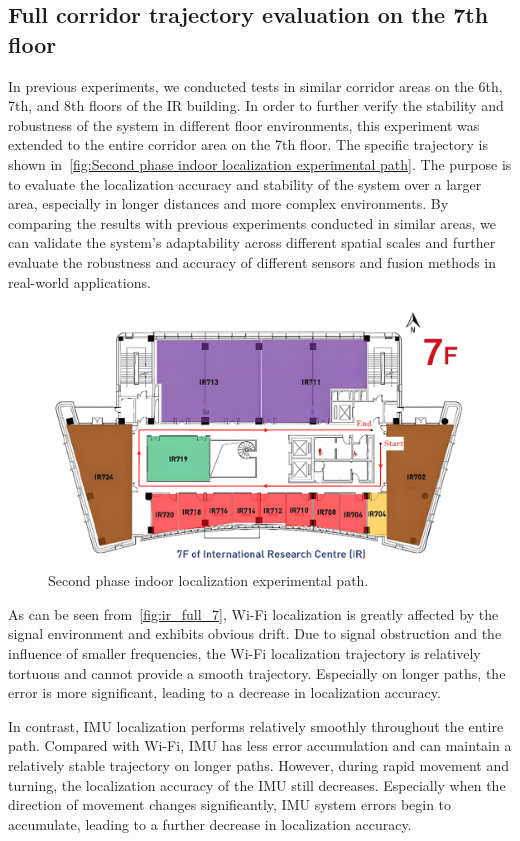 \documentclass[12pt,a4paper]{article}
\numberwithin{equation}{section}
\begin{document}
\subsection{Full corridor trajectory evaluation on the 7th floor}
In previous experiments, we conducted tests in similar corridor areas on the
6th, 7th, and 8th floors of the IR building. In order to further verify the
stability and robustness of the system in different floor environments, this
experiment was extended to the entire corridor area on the 7th floor. The
specific trajectory is shown in~\autoref{fig:Second phase indoor localization
  experimental path}. The purpose is to evaluate the localization accuracy and
stability of the system over a larger area, especially in longer distances and
more complex environments. By comparing the results with previous experiments
conducted in similar areas, we can validate the system's adaptability across
different spatial scales and further evaluate the robustness and accuracy of
different sensors and fusion methods in real-world applications.
\begin{figure}[H]
  \centering
  \includegraphics[width=0.9\linewidth]{images/ir_full_circle.png}
  \caption{Second phase indoor localization experimental path.}
  \label{fig:Second phase indoor localization experimental path}
\end{figure}

As can be seen from~\autoref{fig:ir_full_7}, Wi-Fi localization is greatly
affected by the signal environment and exhibits obvious drift. Due to signal
obstruction and the influence of smaller frequencies, the Wi-Fi localization
trajectory is relatively tortuous and cannot provide a smooth
trajectory. Especially on longer paths, the error is more significant, leading
to a decrease in localization accuracy.

In contrast, IMU localization performs relatively smoothly throughout the entire
path. Compared with Wi-Fi, IMU has less error accumulation and can maintain a
relatively stable trajectory on longer paths. However, during rapid movement and
turning, the localization accuracy of the IMU still decreases. Especially when
the direction of movement changes significantly, IMU system errors begin to
accumulate, leading to a further decrease in localization accuracy.
\end{document}
